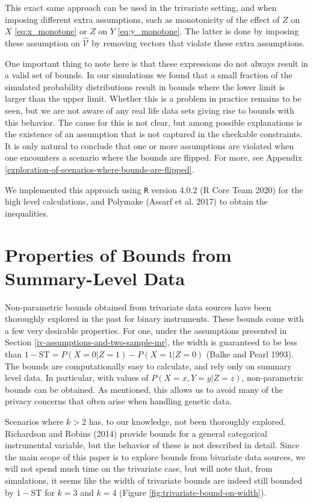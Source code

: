 \documentclass[
]{article}
\theoremstyle{plain}
\begin{document}
This exact same approach can be used in the trivariate setting, and when imposing different extra assumptions, such as monotonicity of the effect of \(Z\) on \(X\) \eqref{eq:x_monotone} or \(Z\) on \(Y\) \eqref{eq:y_monotone}. The latter is done by imposing these assumption on \(\hat{\mathcal{V}}\) by removing vectors that violate these extra assumptions.

One important thing to note here is that these expressions do not always result in a valid set of bounds. In our simulations we found that a small fraction of the simulated probability distributions result in bounds where the lower limit is larger than the upper limit. Whether this is a problem in practice remains to be seen, but we are not aware of any real life data sets giving rise to bounds with this behavior. The cause for this is not clear, but among possible explanations is the existence of an assumption that is not captured in the checkable constraints. It is only natural to conclude that one or more assumptions are violated when one encounters a scenario where the bounds are flipped. For more, see Appendix \ref{exploration-of-scenarios-where-bounds-are-flipped}.

We implemented this approach using \texttt{R} version 4.0.2 (R Core Team 2020) for the high level calculations, and Polymake (Assarf et al. 2017) to obtain the inequalities.

\hypertarget{properties-of-bounds-from-summary-level-data}{%
\section{Properties of Bounds from Summary-Level Data}\label{properties-of-bounds-from-summary-level-data}}

Non-parametric bounds obtained from trivariate data sources have been thoroughly explored in the past for binary instruments. These bounds come with a few very desirable properties. For one, under the assumptions presented in Section \ref{iv-assumptions-and-two-sample-mr}, the width is guaranteed to be less than \(1 - \text{ST} = P(X = 0 | Z = 1) - P(X = 1 | Z = 0)\) (Balke and Pearl 1993). The bounds are computationally easy to calculate, and rely only on summary level data. In particular, with values of \(P(X = x, Y = y | Z = z)\), non-parametric bounds can be obtained. As mentioned, this allows us to avoid many of the privacy concerns that often arise when handling genetic data.

Scenarios where \(k > 2\) has, to our knowledge, not been thoroughly explored. Richardson and Robins (2014) provide bounds for a general categorical instrumental variable, but the behavior of these is not described in detail. Since the main scope of this paper is to explore bounds from bivariate data sources, we will not spend much time on the trivariate case, but will note that, from simulations, it seems like the width of trivariate bounds are indeed still bounded by \(1 - \text{ST}\) for \(k=3\) and \(k=4\) (Figure \ref{fig:trivariate-bound-on-width}).
\end{document}

